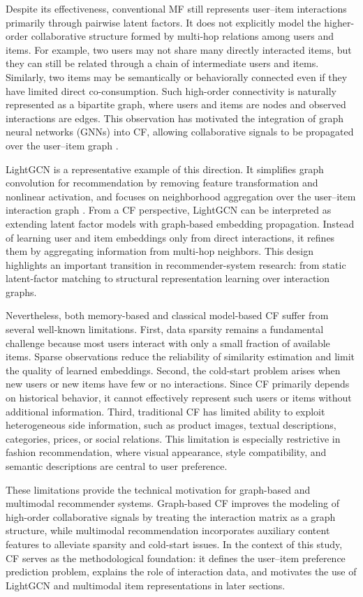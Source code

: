 Despite its effectiveness, conventional MF still represents user--item interactions primarily through pairwise latent factors. It does not explicitly model the higher-order collaborative structure formed by multi-hop relations among users and items. For example, two users may not share many directly interacted items, but they can still be related through a chain of intermediate users and items. Similarly, two items may be semantically or behaviorally connected even if they have limited direct co-consumption. Such high-order connectivity is naturally represented as a bipartite graph, where users and items are nodes and observed interactions are edges. This observation has motivated the integration of graph neural networks (GNNs) into CF, allowing collaborative signals to be propagated over the user--item graph \parencite{11359174}.

LightGCN is a representative example of this direction. It simplifies graph convolution for recommendation by removing feature transformation and nonlinear activation, and focuses on neighborhood aggregation over the user--item interaction graph \parencite{he2020lightgcnsimplifyingpoweringgraph}. From a CF perspective, LightGCN can be interpreted as extending latent factor models with graph-based embedding propagation. Instead of learning user and item embeddings only from direct interactions, it refines them by aggregating information from multi-hop neighbors. This design highlights an important transition in recommender-system research: from static latent-factor matching to structural representation learning over interaction graphs.

Nevertheless, both memory-based and classical model-based CF suffer from several well-known limitations. First, data sparsity remains a fundamental challenge because most users interact with only a small fraction of available items. Sparse observations reduce the reliability of similarity estimation and limit the quality of learned embeddings. Second, the cold-start problem arises when new users or new items have few or no interactions. Since CF primarily depends on historical behavior, it cannot effectively represent such users or items without additional information. Third, traditional CF has limited ability to exploit heterogeneous side information, such as product images, textual descriptions, categories, prices, or social relations. This limitation is especially restrictive in fashion recommendation, where visual appearance, style compatibility, and semantic descriptions are central to user preference.

These limitations provide the technical motivation for graph-based and multimodal recommender systems. Graph-based CF improves the modeling of high-order collaborative signals by treating the interaction matrix as a graph structure, while multimodal recommendation incorporates auxiliary content features to alleviate sparsity and cold-start issues. In the context of this study, CF serves as the methodological foundation: it defines the user--item preference prediction problem, explains the role of interaction data, and motivates the use of LightGCN and multimodal item representations in later sections.
